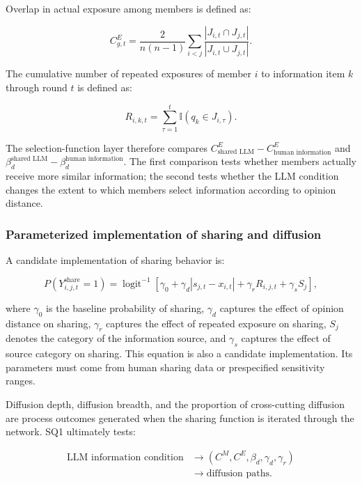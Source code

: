 \documentclass[11pt,a4paper]{article}
\begin{document}
Overlap in actual exposure among members is defined as:

\begin{equation*}
C^{E}_{g,t}
=
\frac{2}{n(n-1)}
\sum_{i<j}
\frac{|J_{i,t}\cap J_{j,t}|}
{|J_{i,t}\cup J_{j,t}|}.
\end{equation*}

The cumulative number of repeated exposures of member $i$ to information item $k$ through round $t$ is defined as:

\begin{equation*}
R_{i,k,t}
=
\sum_{\tau=1}^{t}
\mathbb I(q_k\in J_{i,\tau}).
\end{equation*}

The selection-function layer therefore compares $C^{E}_{\text{shared LLM}}-C^{E}_{\text{human information}}$ and $\beta_d^{\text{shared LLM}}-\beta_d^{\text{human information}}$. The first comparison tests whether members actually receive more similar information; the second tests whether the LLM condition changes the extent to which members select information according to opinion distance.

\subsubsection{Parameterized implementation of sharing and diffusion}

A candidate implementation of sharing behavior is:

\begin{equation*}
P(Y_{i,j,t}^{\text{share}}=1)
=
\operatorname{logit}^{-1}
\left[
\gamma_0
+
\gamma_d|s_{j,t}-x_{i,t}|
+
\gamma_rR_{i,j,t}
+
\gamma_sS_j
\right],
\end{equation*}

where $\gamma_0$ is the baseline probability of sharing, $\gamma_d$ captures the effect of opinion distance on sharing, $\gamma_r$ captures the effect of repeated exposure on sharing, $S_j$ denotes the category of the information source, and $\gamma_s$ captures the effect of source category on sharing. This equation is also a candidate implementation. Its parameters must come from human sharing data or prespecified sensitivity ranges.

Diffusion depth, diffusion breadth, and the proportion of cross-cutting diffusion are process outcomes generated when the sharing function is iterated through the network. SQ1 ultimately tests:

\begin{equation*}
\begin{aligned}\text{LLM information condition} &\rightarrow \left( C^{M},C^{E},\beta_d,\gamma_d,\gamma_r \right) \\
&\rightarrow \text{diffusion paths}.\end{aligned}
\end{equation*}
\end{document}

